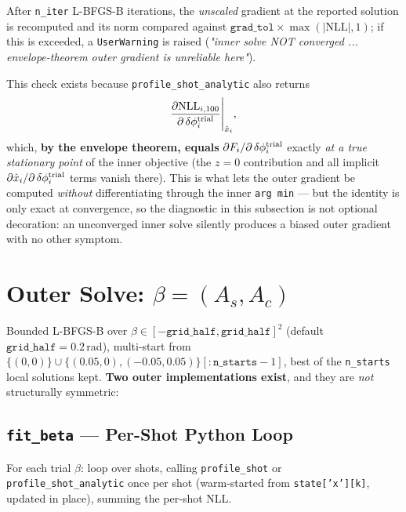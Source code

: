 \documentclass[11pt,a4paper]{article}
\newcommand{\code}[1]{\texttt{#1}}
\begin{document}
After \code{n\_iter} L-BFGS-B iterations, the \emph{unscaled} gradient at
the reported solution is recomputed and its norm compared against
$\code{grad\_tol}\times\max(|\mathrm{NLL}|,1)$; if this is exceeded, a
\code{UserWarning} is raised (\emph{"inner solve NOT converged ...
envelope-theorem outer gradient is unreliable here"}).

This check exists because \code{profile\_shot\_analytic} also returns
\begin{equation}
  \frac{\partial \mathrm{NLL}_{i,100}}{\partial\,\delta\phi_i^{\rm trial}}
  \Bigg|_{\hat x_i},
\end{equation}
which, \textbf{by the envelope theorem, equals}
$\partial F_i/\partial\,\delta\phi_i^{\rm trial}$ exactly \emph{at a true
stationary point} of the inner objective (the $z{=}0$ contribution and all
implicit $\partial\hat x_i/\partial\,\delta\phi_i^{\rm trial}$ terms vanish
there). This is what lets the outer gradient be computed \emph{without}
differentiating through the inner \code{arg min} --- but the identity is
only exact at convergence, so the diagnostic in this subsection is not
optional decoration: an unconverged inner solve silently produces a biased
outer gradient with no other symptom.

\section{Outer Solve: $\beta=(A_s,A_c)$}
\label{sec:outer}

Bounded L-BFGS-B over $\beta\in[-\code{grid\_half},\code{grid\_half}]^2$
(default $\code{grid\_half}=0.2$\,rad), multi-start from
$\{(0,0)\}\cup\{(0.05,0),(-0.05,0.05)\}[:\code{n\_starts}{-}1]$, best of the
\code{n\_starts} local solutions kept. \textbf{Two outer implementations
exist}, and they are \emph{not} structurally symmetric:

\subsection{\code{fit\_beta} --- Per-Shot Python Loop}

For each trial $\beta$: loop over shots, calling \code{profile\_shot} or
\code{profile\_shot\_analytic} once per shot (warm-started from
\code{state['x'][k]}, updated in place), summing the per-shot NLL.
\end{document}
